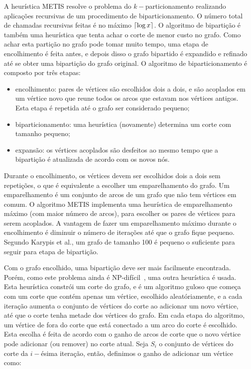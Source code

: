 \documentclass[conference]{IEEEtran}
\DeclarePairedDelimiter\ceil{\lceil}{\rceil}
\begin{document}
A heurística METIS resolve o problema do $k-$particionamento realizando
aplicações recursivas de um procedimento de biparticionamento. O número
total de chamadas recursivas feitas é no máximo $\ceil{\log x}$. O
algoritmo de bipartição é também uma heurística que tenta achar o
corte de menor custo no grafo. Como achar esta partição no grafo pode
tomar muito tempo, uma etapa de encolhimento é feita antes, e depois
disso o grafo bipartido é expandido e refinado até se obter uma
bipartição do grafo original. O algoritmo de biparticionamento é
composto por três etapas:
\begin{itemize}
\item{encolhimento:} pares de vértices são escolhidos dois
    a dois, e são acoplados em um vértice novo que reune todos os arcos
    que estavam nos vértices antigos. Esta etapa é repetida até o
    grafo ser considerado pequeno;
\item{biparticionamento:} uma heurística (novamente) determina um corte
    com tamanho pequeno;
\item{expansão:} os vértices acoplados são desfeitos ao mesmo tempo que
    a bipartição é atualizada de acordo com os novos nós.
\end{itemize}

Durante o encolhimento, os vértices devem ser escolhidos dois a dois sem
repetições, o que é equivalente a escolher um emparelhamento do grafo.
Um emparelhamento é um conjunto de arcos de um grafo que não tem
vértices em comum. O algoritmo METIS implementa uma heurística
de emparelhamento máximo (com maior número de arcos), para escolher os
pares de vértices para serem acoplados. A vantagem de fazer um
emparelhamento máximo durante o encolhimento é diminuir o número de
iterações até que o grafo fique pequeno. Segundo Karypis et al., um
grafo de tamanho 100 é pequeno o suficiente para seguir para etapa de
bipartição.

Com o grafo encolhido, uma bipartição deve ser mais facilmente
encontrada. Porém, como este problema ainda é
NP-difícil~\cite{graphpartitioning}, uma outra heurística é usada. Esta
heurística constrói um corte do grafo, e é um algoritmo guloso que
começa com um corte que contém apenas um vértice, escolhido
aleatóriamente, e a cada iteração aumenta o conjunto de vértices do
corte ao adicionar um novo vértice, até que o corte tenha metade dos
vértices do grafo. Em cada etapa do algoritmo, um vértice de fora do
corte que está conectado a um arco do corte é escolhido. Esta escolha é
feita de acordo com o ganho de arcos de corte que o novo vértice pode
adicionar (ou remover) no corte atual. Seja $S_i$ o conjunto de vértices
do corte da $i-$ésima iteração, então, definimos o ganho de adicionar um
vértice como:
\end{document}
